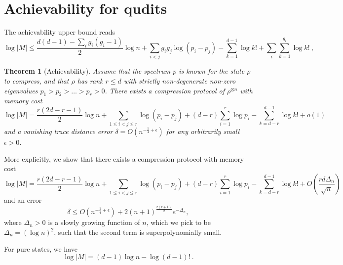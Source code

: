 \documentclass[11pt,letterpaper]{article}
\newtheorem{thm}{Theorem}
\begin{document}
\section{Achievability for qudits}
The achievability upper bound reads
\begin{equation}\label{eq:achievable_degenerate}
    \log|M|\le \frac{d(d-1)-\sum_i g_i(g_i-1)}{2}\log n+\sum_{i<j}g_ig_j\log(p_i-p_j) -\sum_{k=1}^{d-1}\log k!+\sum_i\sum_{k=1}^{g_i}\log k!\ ,
\end{equation}



\begin{thm}[Achievability]\label{thm:qudit_compression_fixed_p}
Assume that the spectrum $p$ is known for the state $\rho$ to compress, and that $\rho$ has rank $r \le d$ with strictly non-degenerate non-zero eigenvalues $p_1 > p_2 > \dots > p_r > 0$. 
There exists a compression protocol of $\rho^{\otimes n}$ with memory cost
\begin{equation}
    \log|M| = \frac{r(2d-r-1)}{2}\log n + \sum_{1 \le i < j \le r}\log(p_i-p_j) + (d-r)\sum_{i=1}^r \log p_i - \sum_{k=d-r}^{d-1}\log k! + o(1)
\end{equation}
and a vanishing trace distance error $\delta=O(n^{-\frac14+\epsilon})$ for any arbitrarily small $\epsilon>0$.
\end{thm}

More explicitly, we show that there exists a compression protocol with memory cost
\begin{equation}
    \log|M| = \frac{r(2d-r-1)}{2}\log n + \sum_{1 \le i < j \le r}\log(p_i-p_j) + (d-r)\sum_{i=1}^r \log p_i - \sum_{k=d-r}^{d-1}\log k! + O\left(\frac{r d \Delta_n}{\sqrt{n}}\right)
\end{equation}
and an error 
\begin{equation}
    \delta\le O(n^{-\frac14+\epsilon}) + 2(n+1)^{\frac{r(r+1)}{2}}e^{-\Delta_n},
\end{equation}
where $\Delta_n>0$ is a slowly growing function of $n$, which we pick to be $\Delta_n=(\log n)^2$, such that the second term is superpolynomially small.

For pure states, we have
\begin{equation}\label{eq:achievable_pure}
    \log|M|=(d-1)\log n -\log (d-1)!\ .
\end{equation}
\end{document}
